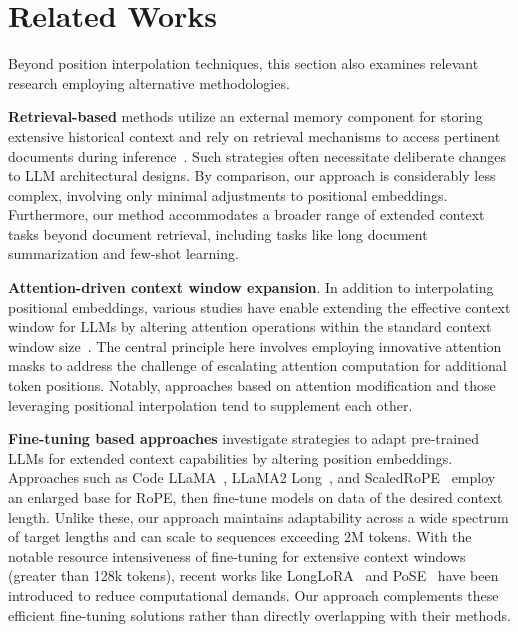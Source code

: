 \section{Related Works}

Beyond position interpolation techniques, this section also examines relevant research employing alternative methodologies.

\textbf{Retrieval-based} methods utilize an external memory component for storing extensive historical context and rely on retrieval mechanisms to access pertinent documents during inference~\cite{longllama,wang2023augmenting,borgeaud2022improving}. Such strategies often necessitate deliberate changes to LLM architectural designs. By comparison, our approach is considerably less complex, involving only minimal adjustments to positional embeddings. Furthermore, our method accommodates a broader range of extended context tasks beyond document retrieval, including tasks like long document summarization and few-shot learning.

\textbf{Attention-driven context window expansion}. In addition to interpolating positional embeddings, various studies have enable extending the effective context window for LLMs by altering attention operations within the standard context window size~\cite{han2023lminfinite, streamingllm,parallelwindow}. The central principle here involves employing innovative attention masks to address the challenge of escalating attention computation for additional token positions. Notably, approaches based on attention modification and those leveraging positional interpolation tend to supplement each other.

\textbf{Fine-tuning based approaches} investigate strategies to adapt pre-trained LLMs for extended context capabilities by altering position embeddings. Approaches such as Code LLaMA~\cite{codellama}, LLaMA2 Long~\cite{xiong2023effective}, and ScaledRoPE~\cite{liu2023scaling} employ an enlarged base for RoPE, then fine-tune models on data of the desired context length. Unlike these, our approach maintains adaptability across a wide spectrum of target lengths and can scale to sequences exceeding 2M tokens. With the notable resource intensiveness of fine-tuning for extensive context windows (greater than 128k tokens), recent works like LongLoRA~\cite{longlora} and PoSE~\cite{zhu2023pose} have been introduced to reduce computational demands. Our approach complements these efficient fine-tuning solutions rather than directly overlapping with their methods.

